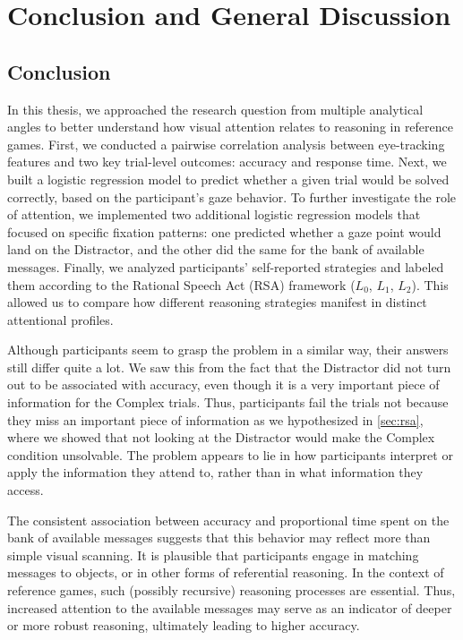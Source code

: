 ﻿\chapter{Conclusion and General Discussion}
\label{chap:conclusion}

\section{Conclusion}
\label{sec:conclusion}

In this thesis, we approached the research question from multiple analytical angles to better understand how visual attention relates to reasoning in reference games. First, we conducted a pairwise correlation analysis between eye-tracking features and two key trial-level outcomes: accuracy and response time. Next, we built a logistic regression model to predict whether a given trial would be solved correctly, based on the participant's gaze behavior. To further investigate the role of attention, we implemented two additional logistic regression models that focused on specific fixation patterns: one predicted whether a gaze point would land on the Distractor, and the other did the same for the bank of available messages. Finally, we analyzed participants' self-reported strategies and labeled them according to the Rational Speech Act (RSA) framework ($L_0$, $L_1$, $L_2$). This allowed us to compare how different reasoning strategies manifest in distinct attentional profiles.

Although participants seem to grasp the problem in a similar way, their answers still differ quite a lot. We saw this from the fact that the Distractor did not turn out to be associated with accuracy, even though it is a very important piece of information for the Complex trials. Thus, participants fail the trials not because they miss an important piece of information as we hypothesized in \autoref{sec:rsa}, where we showed that not looking at the Distractor would make the Complex condition unsolvable. The problem appears to lie in how participants interpret or apply the information they attend to, rather than in what information they access.

The consistent association between accuracy and proportional time spent on the bank of available messages suggests that this behavior may reflect more than simple visual scanning. It is plausible that participants engage in matching messages to objects, or in other forms of referential reasoning. In the context of reference games, such (possibly recursive) reasoning processes are essential. Thus, increased attention to the available messages may serve as an indicator of deeper or more robust reasoning, ultimately leading to higher accuracy.

